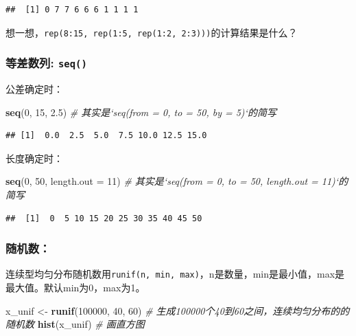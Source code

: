 \documentclass[]{book}
\newenvironment{Shaded}{\begin{snugshade}}{\end{snugshade}}
\newcommand{\CommentTok}[1]{\textcolor[rgb]{0.56,0.35,0.01}{\textit{#1}}}
\newcommand{\DataTypeTok}[1]{\textcolor[rgb]{0.13,0.29,0.53}{#1}}
\newcommand{\DecValTok}[1]{\textcolor[rgb]{0.00,0.00,0.81}{#1}}
\newcommand{\FloatTok}[1]{\textcolor[rgb]{0.00,0.00,0.81}{#1}}
\newcommand{\KeywordTok}[1]{\textcolor[rgb]{0.13,0.29,0.53}{\textbf{#1}}}
\newcommand{\NormalTok}[1]{#1}
\newcommand{\StringTok}[1]{\textcolor[rgb]{0.31,0.60,0.02}{#1}}
\begin{document}
\begin{verbatim}
##  [1] 0 7 7 6 6 6 1 1 1 1
\end{verbatim}

想一想，\texttt{rep(8:15,\ rep(1:5,\ rep(1:2,\ 2:3)))}的计算结果是什么？

\hypertarget{seq}{%
\subsubsection{\texorpdfstring{等差数列: \texttt{seq()}}{等差数列: seq()}}\label{seq}}

公差确定时：

\begin{Shaded}
\begin{Highlighting}[]
\KeywordTok{seq}\NormalTok{(}\DecValTok{0}\NormalTok{, }\DecValTok{15}\NormalTok{, }\FloatTok{2.5}\NormalTok{) }\CommentTok{# 其实是`seq(from = 0, to = 50, by = 5)`的简写}
\end{Highlighting}
\end{Shaded}

\begin{verbatim}
## [1]  0.0  2.5  5.0  7.5 10.0 12.5 15.0
\end{verbatim}

长度确定时：

\begin{Shaded}
\begin{Highlighting}[]
 \KeywordTok{seq}\NormalTok{(}\DecValTok{0}\NormalTok{, }\DecValTok{50}\NormalTok{, }\DataTypeTok{length.out =} \DecValTok{11}\NormalTok{) }\CommentTok{# 其实是`seq(from = 0, to = 50, length.out = 11)`的简写}
\end{Highlighting}
\end{Shaded}

\begin{verbatim}
##  [1]  0  5 10 15 20 25 30 35 40 45 50
\end{verbatim}

\hypertarget{random-nums}{%
\subsubsection{随机数：}\label{random-nums}}

连续型均匀分布随机数用\texttt{runif(n,\ min,\ max)}，n是数量，min是最小值，max是最大值。默认min为0，max为1。

\begin{Shaded}
\begin{Highlighting}[]
\NormalTok{x_unif <-}\StringTok{ }\KeywordTok{runif}\NormalTok{(}\DecValTok{100000}\NormalTok{, }\DecValTok{40}\NormalTok{, }\DecValTok{60}\NormalTok{) }\CommentTok{# 生成100000个40到60之间，连续均匀分布的的随机数}
\KeywordTok{hist}\NormalTok{(x_unif) }\CommentTok{# 画直方图}
\end{Highlighting}
\end{Shaded}
\end{document}
